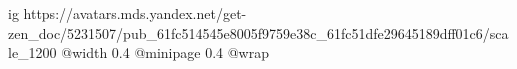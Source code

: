  
 
 
 
 

\ifcmt
  ig https://avatars.mds.yandex.net/get-zen_doc/5231507/pub_61fc514545e8005f9759e38c_61fc51dfe29645189dff01c6/scale_1200
  @width 0.4
  @minipage 0.4
  @wrap \parpic[r]
\fi
